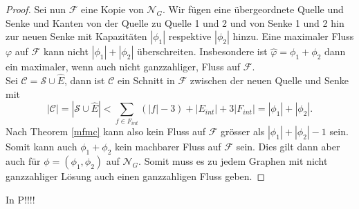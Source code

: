 \begin{proof}
Sei nun $\mathcal{F}$ eine Kopie von $\mathcal{N}_G$. Wir fügen eine übergeordnete Quelle und Senke und Kanten von der Quelle zu Quelle 1 und 2 und von Senke 1 und 2 hin zur neuen Senke mit Kapazitäten $|\phi_1|$ respektive $|\phi_2|$ hinzu. Eine maximaler Fluss $\varphi$ auf $\mathcal{F}$ kann nicht $|\phi_1| + |\phi_2|$ überschreiten. Insbesondere ist $ \hat{\varphi} = \phi_1 + \phi_2 $ dann ein maximaler, wenn auch nicht ganzzahliger, Fluss auf $\mathcal{F}$.\\

Sei $\mathcal{C} = \mathcal{S} \cup \hat{E}$, dann ist $\mathcal{C}$ ein Schnitt in $\mathcal{F}$ zwischen der neuen Quelle und Senke mit $$|\mathcal{C}| = |\mathcal{S} \cup \hat{E}| < \sum_{f \in F_{int}}{(|f|-3)} +  |E_{int}| + 3|F_{int}|  = |\phi_1| + |\phi_2|.$$ 
Nach Theorem \ref{mfmc} kann also kein Fluss auf $\mathcal{F}$ grösser als $|\phi_1| + |\phi_2| - 1$ sein. Somit kann auch $\phi_1 + \phi_2$ kein machbarer Fluss auf $\mathcal{F}$ sein. Dies gilt dann aber auch für $\phi = (\phi_1,\phi_2)$ auf $\mathcal{N}_G.$ Somit muss es zu jedem Graphen mit nicht ganzzahliger Lösung auch einen ganzzahligen Fluss geben.

\end{proof}

\begin{corollary}

In P!!!!

\end{corollary}
